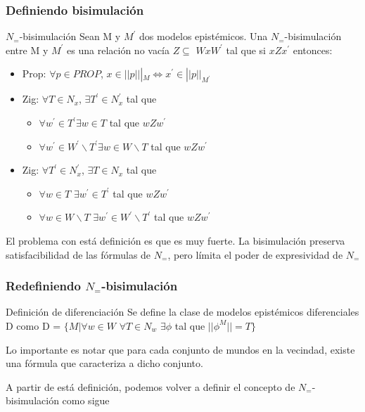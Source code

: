 \documentclass{beamer}
\begin{document}
\begin{frame}
\frametitle{Definiendo bisimulaci\'on}

\begin{block}{$N_{=}$-bisimulaci\'on}
Sean M y $M^{'}$ dos modelos epist\'emicos. Una $N_{=}$-bisimulaci\'on entre M y $M^{'}$ es una relaci\'on no vac\'ia $Z \subseteq$ $WxW^{'}$ tal que si $xZx^{'}$ entonces:
\begin{itemize}
\item Prop: $\forall p \in PROP$, $x \in ||p|||_{M} \iff x^{'} \in ||p||_{M^{'}}$
\item Zig: $\forall T \in N_{x}$, $\exists T^{'} \in N^{'}_{x}$ tal que 
\begin{itemize}
\item $\forall w^{'} \in T^{'} \exists w \in T$ tal que $wZw^{'}$
\item $\forall w^{'} \in W^{'}\backslash T^{'} \exists w \in W\backslash T$ tal que $wZw^{'}$
\end{itemize}
\item Zig: $\forall T^{'} \in N_{x}^{'}$, $\exists T \in N_{x}$ tal que 
\begin{itemize}
\item $\forall w \in T$ $\exists w^{'} \in T^{'}$ tal que $wZw^{'}$
\item $\forall w \in W\backslash T$ $\exists w^{'} \in W^{'}\backslash T^{'}$ tal que $wZw^{'}$
\end{itemize}  
\end{itemize}
\end{block}

El problema con est\'a definici\'on es que es muy fuerte. La bisimulaci\'on preserva satisfacibilidad de las f\'ormulas de $N_{=}$, pero l\'imita el poder de expresividad de $N_{=}$

\end{frame}

\begin{frame}
\frametitle{Redefiniendo $N_{=}$-bisimulaci\'on}

\begin{block}{Definici\'on de diferenciaci\'on}
Se define la clase de modelos epist\'emicos diferenciales D como 
D = $\{M | \forall w \in W$ $\forall T \in N_{w}$ $\exists \phi$ tal que $||\phi^{M}|| = T\}$
\end{block}
Lo importante es notar que para cada conjunto de mundos en la vecindad, existe una f\'ormula que caracteriza a dicho conjunto.

A partir de est\'a definici\'on, podemos volver a definir el concepto de $N_{=}$-bisimulaci\'on como sigue

\end{frame}
\end{document}
